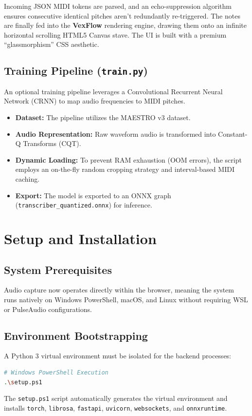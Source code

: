 \documentclass[12pt,a4paper]{article}
\begin{document}
Incoming JSON MIDI tokens are parsed, and an echo-suppression algorithm ensures consecutive identical pitches aren't redundantly re-triggered. The notes are finally fed into the \textbf{VexFlow} rendering engine, drawing them onto an infinite horizontal scrolling HTML5 Canvas stave. The UI is built with a premium ``glassmorphism'' CSS aesthetic.

\subsection{Training Pipeline (\texttt{train.py})}
An optional training pipeline leverages a Convolutional Recurrent Neural Network (CRNN) to map audio frequencies to MIDI pitches.
\begin{itemize}
    \item \textbf{Dataset:} The pipeline utilizes the MAESTRO v3 dataset.
    \item \textbf{Audio Representation:} Raw waveform audio is transformed into Constant-Q Transforms (CQT).
    \item \textbf{Dynamic Loading:} To prevent RAM exhaustion (OOM errors), the script employs an on-the-fly random cropping strategy and interval-based MIDI caching.
    \item \textbf{Export:} The model is exported to an ONNX graph (\texttt{transcriber\_quantized.onnx}) for inference.
\end{itemize}

\section{Setup and Installation}
\subsection{System Prerequisites}
Audio capture now operates directly within the browser, meaning the system runs natively on Windows PowerShell, macOS, and Linux without requiring WSL or PulseAudio configurations.

\subsection{Environment Bootstrapping}
A Python 3 virtual environment must be isolated for the backend processes:
\begin{lstlisting}[language=bash]
# Windows PowerShell Execution
.\setup.ps1
\end{lstlisting}
The \texttt{setup.ps1} script automatically generates the virtual environment and installs \texttt{torch}, \texttt{librosa}, \texttt{fastapi}, \texttt{uvicorn}, \texttt{websockets}, and \texttt{onnxruntime}.
\end{document}
